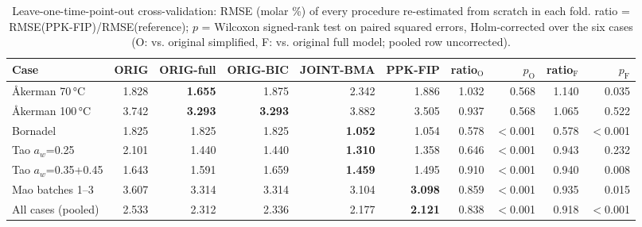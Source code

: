 \begin{table}[t]
\centering
\caption{Leave-one-time-point-out cross-validation: RMSE (molar \%) of every procedure re-estimated from scratch in each fold. ratio = RMSE(PPK-FIP)/RMSE(reference); $p$ = Wilcoxon signed-rank test on paired squared errors, Holm-corrected over the six cases (O: vs. original simplified, F: vs. original full model; pooled row uncorrected).}\label{tab:loto}
\footnotesize
\begin{adjustbox}{max width=\linewidth}
\begin{tabular}{lrrrrrrrrr}
\toprule
Case & ORIG & ORIG-full & ORIG-BIC & JOINT-BMA & PPK-FIP & ratio$_\mathrm{O}$ & $p_\mathrm{O}$ & ratio$_\mathrm{F}$ & $p_\mathrm{F}$ \\
\midrule
Åkerman 70\,°C & 1.828 & \textbf{1.655} & 1.875 & 2.342 & 1.886 & 1.032 & 0.568 & 1.140 & 0.035 \\
Åkerman 100\,°C & 3.742 & \textbf{3.293} & \textbf{3.293} & 3.882 & 3.505 & 0.937 & 0.568 & 1.065 & 0.522 \\
Bornadel & 1.825 & 1.825 & 1.825 & \textbf{1.052} & 1.054 & 0.578 & $<$0.001 & 0.578 & $<$0.001 \\
Tao $a_w$=0.25 & 2.101 & 1.440 & 1.440 & \textbf{1.310} & 1.358 & 0.646 & $<$0.001 & 0.943 & 0.232 \\
Tao $a_w$=0.35+0.45 & 1.643 & 1.591 & 1.659 & \textbf{1.459} & 1.495 & 0.910 & $<$0.001 & 0.940 & 0.008 \\
Mao batches 1--3 & 3.607 & 3.314 & 3.314 & 3.104 & \textbf{3.098} & 0.859 & $<$0.001 & 0.935 & 0.015 \\
\midrule
All cases (pooled) & 2.533 & 2.312 & 2.336 & 2.177 & \textbf{2.121} & 0.838 & $<$0.001 & 0.918 & $<$0.001 \\
\bottomrule
\end{tabular}
\end{adjustbox}
\end{table}
